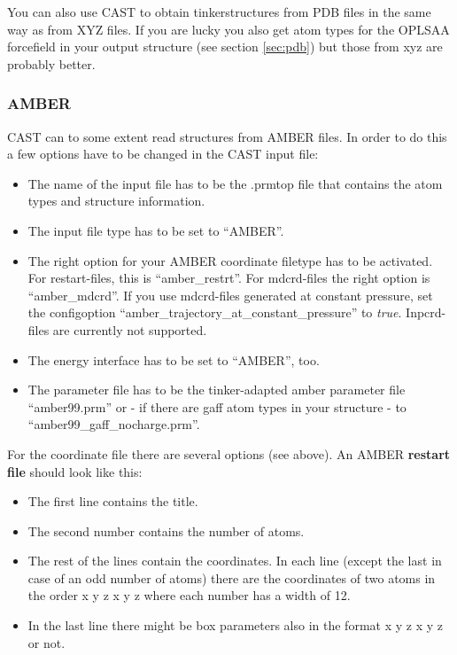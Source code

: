\documentclass[10pt,a4paper]{article} %
\begin{document}
	You can also use CAST to obtain tinkerstructures from PDB files in the same way as from XYZ files. If you are lucky you also get atom types for the OPLSAA forcefield in your output structure (see section \ref{sec:pdb}) but those from xyz are probably better.
	
	\subsubsection{AMBER}

\ac{CAST} can to some extent read structures from \ac{AMBER} files. In order to do this a few options have to be changed in the CAST input file:
\begin{itemize}
\item The name of the input file has to be the .prmtop file that contains the atom types and structure information.
\item The input file type has to be set to ``AMBER''.
\item The right option for your AMBER coordinate filetype has to be activated. For restart-files, this is ``amber\_restrt''. For mdcrd-files the right option is ``amber\_mdcrd''. If you use mdcrd-files generated at constant pressure, set the configoption ``amber\_trajectory\_at\_constant\_pressure'' to \textit{true}. Inpcrd-files are currently not supported.
\item The energy interface has to be set to ``AMBER'', too.
\item The parameter file has to be the tinker-adapted amber parameter file ``amber99.prm'' or - if there are gaff atom types in your structure - to ``amber99\_gaff\_nocharge.prm''.
\end{itemize}

For the coordinate file there are several options (see above). An AMBER \textbf{restart file }should look like this:
\begin{itemize}
\item The first line contains the title.
\item The second number contains the number of atoms.
\item The rest of the lines contain the coordinates. In each line (except the last in case of an odd number of atoms) there are the coordinates of two atoms in the order x y z x y z where each number has a width of 12.
\item In the last line there might be box parameters also in the format x y z x y z or not.
\end{itemize}
\end{document}
